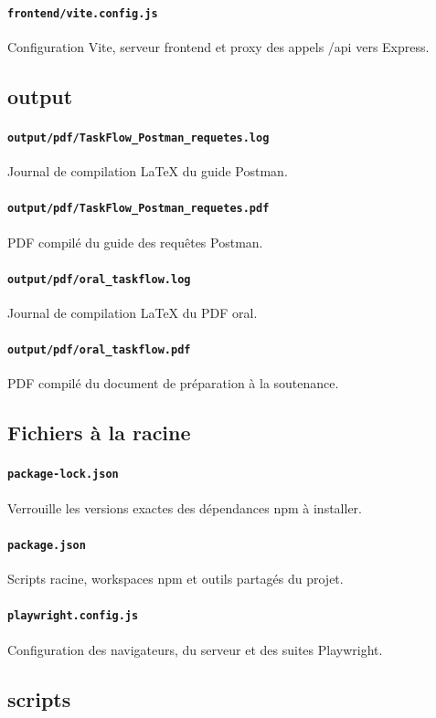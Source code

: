 \documentclass[10pt,a4paper]{article}
\begin{document}
\paragraph{\texttt{frontend/vite.config.js}} Configuration Vite, serveur frontend et proxy des appels /api vers Express.
\subsection*{output}
\paragraph{\texttt{output/pdf/TaskFlow\_Postman\_requetes.log}} Journal de compilation LaTeX du guide Postman.
\paragraph{\texttt{output/pdf/TaskFlow\_Postman\_requetes.pdf}} PDF compilé du guide des requêtes Postman.
\paragraph{\texttt{output/pdf/oral\_taskflow.log}} Journal de compilation LaTeX du PDF oral.
\paragraph{\texttt{output/pdf/oral\_taskflow.pdf}} PDF compilé du document de préparation à la soutenance.
\subsection*{Fichiers à la racine}
\paragraph{\texttt{package-lock.json}} Verrouille les versions exactes des dépendances npm à installer.
\paragraph{\texttt{package.json}} Scripts racine, workspaces npm et outils partagés du projet.
\paragraph{\texttt{playwright.config.js}} Configuration des navigateurs, du serveur et des suites Playwright.
\subsection*{scripts}
\end{document}
